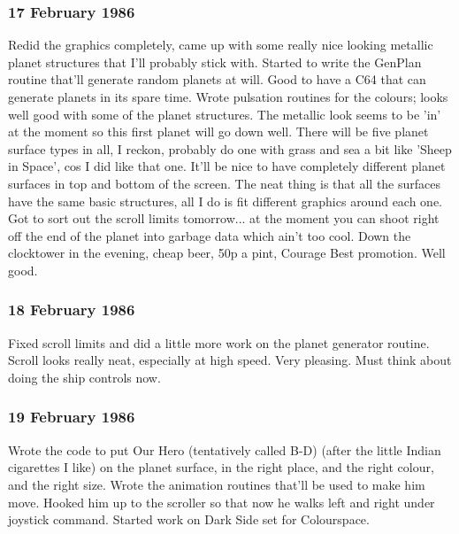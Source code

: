 \subsubsection{17 February 1986}
Redid the graphics completely, came up with some really nice looking metallic planet structures that I'll probably stick with. Started to write the GenPlan routine that'll generate random planets at will. Good to have a C64 that can generate planets in its spare time. Wrote pulsation routines for the colours; looks well good with some of the planet structures. The metallic look seems to be 'in' at the moment so this first planet will go down well. There will be five planet surface types in all, I reckon, probably do one with grass and sea a bit like 'Sheep in Space', cos I did like that one. It'll be nice to have completely different planet surfaces in top and bottom of the screen. The neat thing is that all the surfaces have the same basic structures, all I do is fit different graphics around each one. Got to sort out the scroll limits tomorrow... at the moment you can shoot right off the end of the planet into garbage data which ain't too cool. Down the clocktower in the evening, cheap beer, 50p a pint, Courage Best promotion. Well good.

\subsubsection{18 February 1986}
Fixed scroll limits and did a little more work on the planet generator routine. Scroll looks really neat, especially at high speed. Very pleasing. Must think about doing the ship controls now.

\subsubsection{19 February 1986}
Wrote the code to put Our Hero (tentatively called B-D) (after the little Indian cigarettes I like) on the planet surface, in the right place, and the right colour, and the right size. Wrote the animation routines that'll be used to make him move. Hooked him up to the scroller so that now he walks left and right under joystick command. Started work on Dark Side set for Colourspace.

